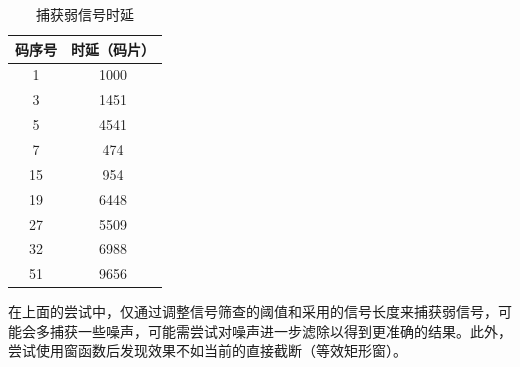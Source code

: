 \documentclass[a4paper, 10pt]{article}
\begin{document}
\begin{table}[ht]
    \centering
    \caption{捕获弱信号时延}
    \label{tab:delay2}
    \begin{tabular}{cc}
        \toprule
        码序号 & 时延（码片） \\
        \midrule
        1      & 1000         \\
        3      & 1451         \\
        5      & 4541         \\
        7      & 474          \\
        15     & 954          \\
        19     & 6448         \\
        27     & 5509         \\
        32     & 6988         \\
        51     & 9656         \\
        \bottomrule
    \end{tabular}
\end{table}

在上面的尝试中，仅通过调整信号筛查的阈值和采用的信号长度来捕获弱信号，可能会多捕获一些噪声，可能需尝试对噪声进一步滤除以得到更准确的结果。此外，尝试使用窗函数后发现效果不如当前的直接截断（等效矩形窗）。
\end{document}
